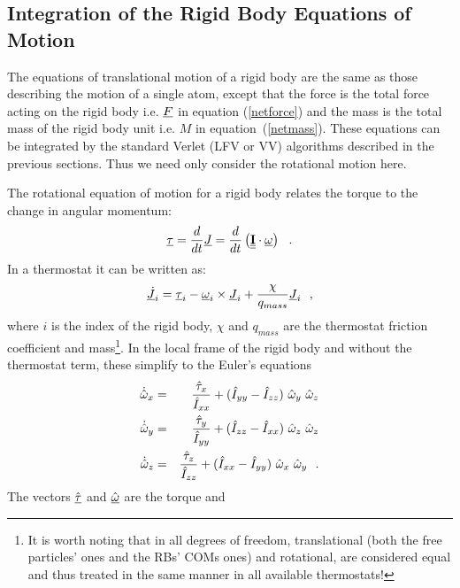 \subsection{Integration of the Rigid Body Equations of Motion}

The equations of translational motion of a rigid body are the same as
those describing the motion of a single atom, except that the force is
the total force acting on the rigid body i.e. $\mbox{$\underline{F}$}$ in equation
(\ref{netforce}) and the mass is the total mass of the rigid body unit
i.e. $M$ in equation~(\ref{netmass}).  These equations can be integrated
by the standard Verlet (LFV or VV) algorithms described in the previous
sections.  Thus we need only consider the rotational motion here.

The rotational equation of motion for a rigid body relates the torque to the change in angular momentum:
\begin{equation}
\mbox{$\underline{\tau}$} = {d \over dt}\mbox{$\underline{J}$} ={d \over dt}\left(\mbox{$\underline{\underline{\bf I}}$} \cdot \mbox{$\underline{\omega}$}\right)~~.\label{torquemotion}
\end{equation}
In a thermostat it can be written as:
\begin{equation}
\dot{\mbox{$\underline{J}$}_{i}} = \mbox{$\underline{\tau}$}_{i} - \mbox{$\underline{\omega}$}_{i} \times \mbox{$\underline{J}$}_{i} + \frac{\chi}{q_{mass}} \mbox{$\underline{J}$}_{i}~~,
\end{equation}
where $i$ is the index of the rigid body, $\chi$ and ${q_{mass}}$ are
the thermostat friction coefficient and mass\footnote{It is worth noting that
in \D all degrees of freedom, translational (both the free particles' ones and
the RBs' COMs ones) and rotational, are considered equal and thus treated in
the same manner in all available thermostats!}.  In the local frame of the
rigid body and without the thermostat term, these simplify to the Euler's
equations
\begin{eqnarray}
\dot{\hat{\omega}}_{x} &=&
{\hat{\tau}_{x} \over \hat{I}_{xx}}+(\hat{I}_{yy}-\hat{I}_{zz})~\hat{\omega}_{y}~\hat{\omega}_{z} \nonumber \\
\dot{\hat{\omega}}_{y} &=&
{\hat{\tau}_{y}\over \hat{I}_{yy}}+(\hat{I}_{zz}-\hat{I}_{xx})~\hat{\omega}_{z}~\hat{\omega}_{z} \label{euler} \\
\dot{\hat{\omega}}_{z} &=&
{\hat{\tau}_{z}\over \hat{I}_{zz}}+(\hat{I}_{xx}-\hat{I}_{yy})~\hat{\omega}_{x}~\hat{\omega}_{y}~~. \nonumber
\end{eqnarray}
The vectors $\hat{\mbox{$\underline{\tau}$}}$ and $\hat{\mbox{$\underline{\omega}$}}$ are the torque and
